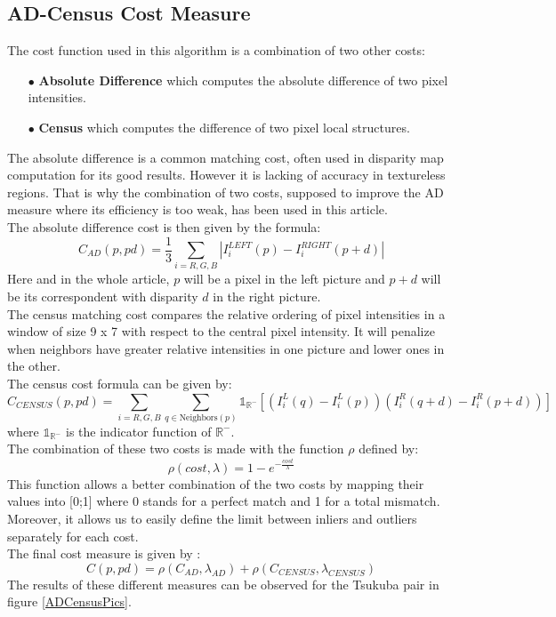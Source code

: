 \documentclass{ipol}
\begin{document}
\subsection{AD-Census Cost Measure}

The cost function used in this algorithm is a combination of two other costs:
\begin{itemize}
	\item[$\bullet$]\textbf{ Absolute Difference} which computes the absolute difference of two pixel intensities.
	\item[$\bullet$]\textbf{ Census} which computes the difference of two pixel local structures.
\end{itemize}

The absolute difference is a common matching cost, often used in disparity map computation for its good results. However it is lacking of accuracy in textureless regions. That is why the combination of two costs, supposed to improve the AD measure where its efficiency is too weak, has been used in this article.\\
The absolute difference cost is then given by the formula:
\[
	C_{AD}(p, pd) = \frac{1}{3} \sum_{i = R, G, B}  | I_i^{LEFT}(p) - I_i^{RIGHT}(p+d) | 
\]
Here and in the whole article, $p$ will be a pixel in the left picture and $p + d$ will be its correspondent with disparity $d$ in the right picture.\\
The census matching cost compares the relative ordering of pixel intensities in a window of size 9 x 7 with respect to the central pixel intensity. It will penalize when neighbors have greater relative intensities in one picture and lower ones in the other.\\
The census cost formula can be given by:
\[
	C_{CENSUS}(p, pd) = \sum_{i = R, G, B} \sum_{q \in \text{Neighbors}(p)} \mathds{1}_{\mathbb{R}^-}\left[\left(I_i^{L}(q)-I_i^{L}(p)\right)\left(I_i^{R}(q+d)-I_i^{R}(p+d)\right)\right]
\]
where $\mathds{1}_{\mathbb{R}^-}$ is the indicator function of $\mathbb{R}^-$.\\
The combination of these two costs is made with the function $\rho$ defined by:
\[
	\rho(cost, \lambda) = 1 - e^{-\frac{cost}{\lambda}}
\]
This function allows a better combination of the two costs by mapping their values into [0;1] where 0 stands for a perfect match and 1 for a total mismatch. Moreover, it allows us to easily define the limit between inliers and outliers separately for each cost.\\
The final cost measure is given by :
\[
	C(p,pd) = \rho(C_{AD}, \lambda_{AD}) + \rho(C_{CENSUS}, \lambda_{CENSUS})
\]
The results of these different measures can be observed for the Tsukuba pair in figure \ref{ADCensusPics}.
\end{document}
